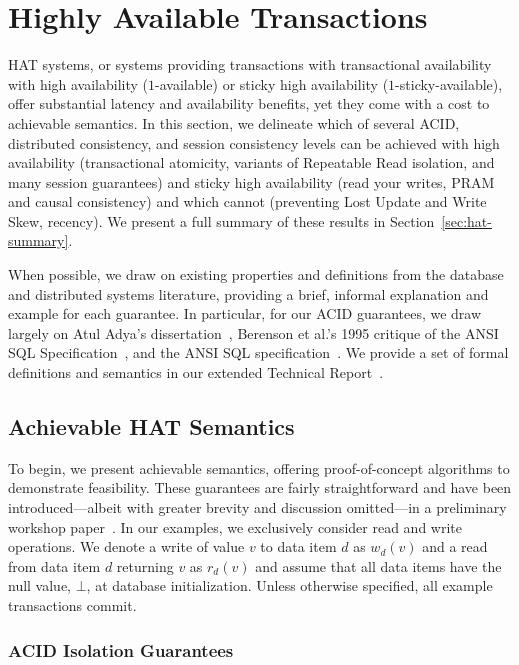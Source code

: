 
\section{Highly Available Transactions}
\label{sec:hats}

HAT systems, or systems providing transactions with transactional
availability with high availability ($1$-available) or sticky high
availability ($1$-sticky-available), offer substantial latency and
availability benefits, yet they come with a cost to achievable
semantics. In this section, we delineate which of several ACID,
distributed consistency, and session consistency levels can be
achieved with high availability (transactional atomicity, variants of
Repeatable Read isolation, and many session guarantees) and sticky
high availability (read your writes, PRAM and causal consistency) and
which cannot (preventing Lost Update and Write Skew, recency).  We
present a full summary of these results in
Section~\ref{sec:hat-summary}.

When possible, we draw on existing properties and definitions from the
database and distributed systems literature, providing a brief,
informal explanation and example for each guarantee. In particular,
for our ACID guarantees, we draw largely on Atul Adya's
dissertation~\cite{adya}, Berenson et al.'s 1995 critique of the ANSI
SQL Specification~\cite{ansicritique}, and the ANSI SQL
specification~\cite{ansi-sql}. We provide a set of formal definitions
and semantics in our extended Technical Report~\cite{hat-tr}.


\subsection{Achievable HAT Semantics}

To begin, we present achievable semantics, offering proof-of-concept
algorithms to demonstrate feasibility. These guarantees are fairly
straightforward and have been introduced---albeit with greater brevity
and discussion omitted---in a preliminary workshop
paper~\cite{hat-hotos}. In our examples, we exclusively consider read
and write operations. We denote a write of value $v$ to data item $d$
as $w_d(v)$ and a read from data item $d$ returning $v$ as $r_d(v)$
and assume that all data items have the null value, $\bot$, at
database initialization. Unless otherwise specified, all example
transactions commit.

\subsubsection{ACID Isolation Guarantees}

